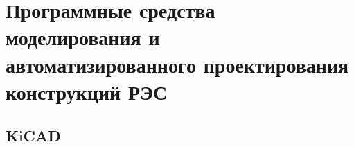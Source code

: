 
\section{Программные средства моделирования и автоматизированного проектирования конструкций РЭС}

\subsection{KiCAD}

\newpage
